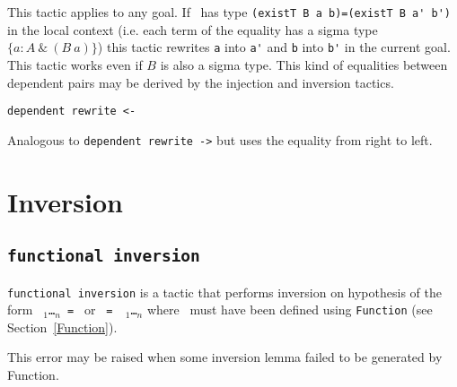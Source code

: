 \begin{coq_example*}
This tactic applies to any goal.  If \ident\ has type
\verb+(existT B a b)=(existT B a' b')+
in the local context (i.e. each term of the
equality has a sigma type $\{ a:A~ \&~(B~a)\}$) this tactic rewrites
\verb+a+ into \verb+a'+ and \verb+b+ into \verb+b'+ in the current
goal. This tactic works even if $B$ is also a sigma type.  This kind
of equalities between dependent pairs may be derived by the injection
and inversion tactics.

\begin{Variants}
\item{\tt dependent rewrite <- {\ident}}

Analogous to {\tt dependent rewrite ->} but uses the equality from
right to left.
\end{Variants}

\section{Inversion
\label{inversion}}

\subsection{\tt functional inversion \ident}
\label{sec:functional-inversion}

\texttt{functional inversion} is a tactic
that performs inversion on hypothesis {\ident} of the form
\texttt{\qualid\ \term$_1$\dots\term$_n$\ = \term} or \texttt{\term\ =
  \qualid\ \term$_1$\dots\term$_n$} where \qualid\ must have been
defined using \texttt{Function} (see Section~\ref{Function}).

\begin{ErrMsgs}
\item {}

\item {}

  This error may be raised when  some inversion lemma failed to be
  generated by Function.
\end{ErrMsgs}

\end{coq_example*}
